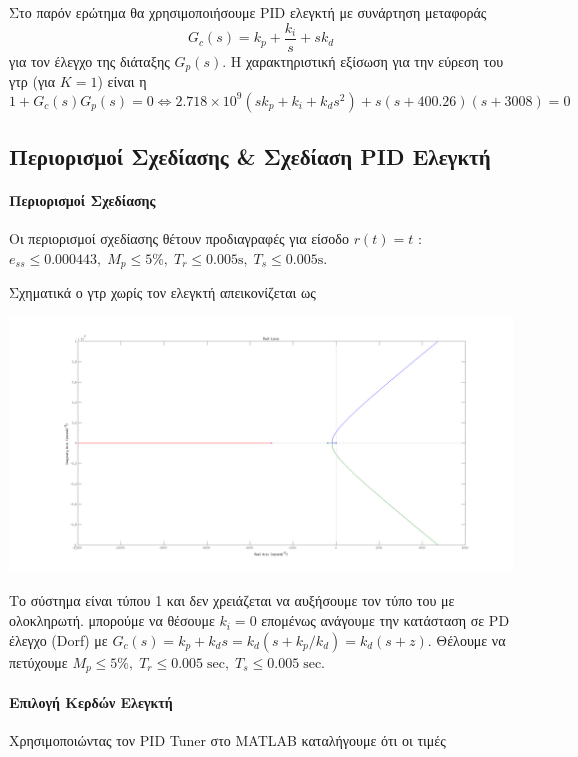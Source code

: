 \documentclass[a4paper,oneside, 10pt]{article}
\begin{document}
Στο παρόν ερώτημα θα χρησιμοποιήσουμε PID ελεγκτή με συνάρτηση μεταφοράς $$G_c(s) = k_p + \frac {k_i} s + s k_d$$ για τον έλεγχο της διάταξης $G_p(s)$. Η χαρακτηριστική εξίσωση για την εύρεση του γτρ (για $K = 1$) είναι η $$1 + G_c(s) G_p(s) = 0 \iff 2.718 \times 10^9 (s k_p + k_i + k_d s^2) + s (s + 400.26) (s + 3008) = 0$$

\subsection*{Περιορισμοί Σχεδίασης \& Σχεδίαση PID Ελεγκτή} 

\paragraph{Περιορισμοί Σχεδίασης} 

Οι περιορισμοί σχεδίασης θέτουν προδιαγραφές για είσοδο $r(t) = t $ : $e_{ss} \le 0.000443, \; M_p \le 5 \%, \; T_r \le 0.005 \mathrm s, \; T_s \le 0.005 \mathrm s$.

Σχηματικά ο γτρ χωρίς τον ελεγκτή απεικονίζεται ως

\includegraphics[width=\textwidth]{plant3_rlocus.png}


Το σύστημα είναι τύπου 1 και δεν χρειάζεται να αυξήσουμε τον τύπο του με ολοκληρωτή.  μπορούμε να θέσουμε $k_i = 0$ επομένως ανάγουμε την κατάσταση σε PD έλεγχο (Dorf) με $G_c(s) = k_p + k_d s = k_d (s + k_p / k_d) = k_d (s + z)$. Θέλουμε να πετύχουμε $M_p \le 5 \%, \; T_r \le 0.005 \; \mathrm{sec}, \; T_s \le 0.005 \; \mathrm {sec}$.
  
\paragraph{Επιλογή Κερδών Ελεγκτή} Χρησιμοποιώντας τον PID Tuner στο MATLAB καταλήγουμε ότι οι τιμές 
\end{document}
